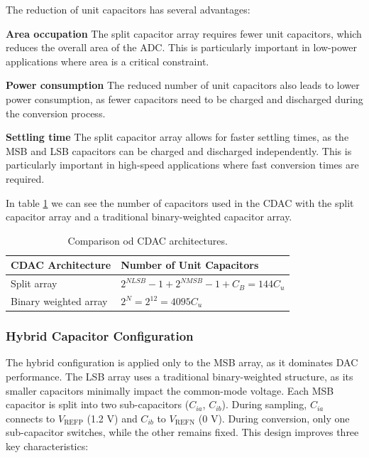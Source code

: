 The reduction of unit capacitors has several advantages:

\textbf{Area occupation}
The split capacitor array requires fewer unit capacitors, which reduces the overall area of the ADC. This is particularly important in low-power applications where area is a critical constraint.

\textbf{Power consumption}
The reduced number of unit capacitors also leads to lower power consumption, as fewer capacitors need to be charged and discharged during the conversion process.

\textbf{Settling time}
The split capacitor array allows for faster settling times, as the MSB and LSB capacitors can be charged and discharged independently. This is particularly important in high-speed applications where fast conversion times are required.

In table \ref{tab:cap-numbers} we can see the number of capacitors used in the CDAC with the split capacitor array and a traditional binary-weighted capacitor array.

\begin{table}[h]
    \centering
    \caption{Comparison od CDAC architectures.}
    \begin{tabularx}{\textwidth}{>{\centering\arraybackslash}X >{\centering\arraybackslash}X}
        \toprule
        \textbf{CDAC Architecture} & \textbf{Number of Unit Capacitors} \\
        \midrule
        Split array & $2^{NLSB} -1 + 2^{NMSB} - 1 + C_B = 144C_u$\\
        \midrule
        Binary weighted array & $2^N = 2^{12} = 4095C_u$ \\
        \bottomrule
    \end{tabularx}
    \label{tab:cap-numbers}
\end{table}

\subsubsection{Hybrid Capacitor Configuration}  
The hybrid configuration is applied only to the MSB array, as it dominates DAC performance. The LSB array uses a traditional binary-weighted structure, as its smaller capacitors minimally impact the common-mode voltage. Each MSB capacitor is split into two sub-capacitors ($C_{ia}$, $C_{ib}$). During sampling, $C_{ia}$ connects to $V_{\text{REFP}}$ (1.2 V) and $C_{ib}$ to $V_{\text{REFN}}$ (0 V). During conversion, only one sub-capacitor switches, while the other remains fixed. This design improves three key characteristics:  

